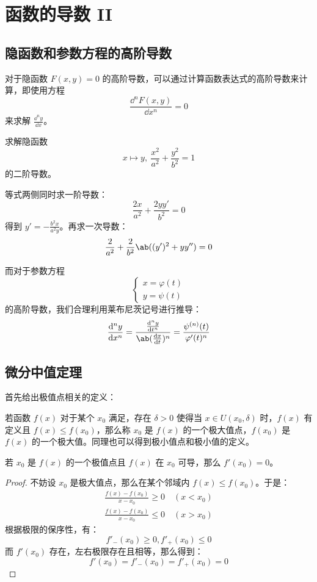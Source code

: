 \section{函数的导数 II}

\subsection{隐函数和参数方程的高阶导数}

对于隐函数 $F(x, y) = 0$ 的高阶导数，可以通过计算函数表达式的高阶导数来计算，即使用方程
$$
\frac{\dd^n F(x, y)}{\dd x^n} = 0
$$
来求解 $\frac{\dd^n y}{\dd x}$。

\begin{example}
	求解隐函数 
	$$
	x \mapsto y,\ \frac{x^2}{a^2} + \frac{y^2}{b^2} = 1
	$$
	的二阶导数。

	\begin{solution}
		等式两侧同时求一阶导数：
		$$
		\frac{2x}{a^2} + \frac{2y y'}{b^2} = 0
		$$
		得到 $y' = -\frac{b^2 x}{a^2 y}$。再求一次导数：
		$$
		\frac{2}{a^2} + \frac{2}{b^2} \ab((y')^2 + y y'') = 0
		$$
	\end{solution}
\end{example}

而对于参数方程
$$
\begin{cases}
	x = \varphi(t) \\
	y = \psi(t)
\end{cases}
$$
的高阶导数，我们合理利用莱布尼茨记号进行推导：
$$
\frac{\dd^n y}{\dd x^n} = \frac{\frac{\dd^n y}{\dd t^n}}{\ab(\dv{x}{t})^n} = \frac{\psi^{(n)}(t)}{\varphi'(t)^n}
$$

\subsection{微分中值定理}

首先给出极值点相关的定义：

\begin{definition}[极值和极值点]
	若函数 $f(x)$ 对于某个 $x_0$ 满足，存在 $\delta > 0$ 使得当 $x \in U(x_0, \delta)$ 时，$f(x)$ 有定义且 $f(x) \le f(x_0)$，那么称 $x_0$ 是 $f(x)$ 的一个极大值点，$f(x_0)$ 是 $f(x)$ 的一个极大值。同理也可以得到极小值点和极小值的定义。
\end{definition}

\begin{lemma}[Fermat 引理]
	若 $x_0$ 是 $f(x)$ 的一个极值点且 $f(x)$ 在 $x_0$ 可导，那么 $f'(x_0) = 0$。

	\begin{proof}
		不妨设 $x_0$ 是极大值点，那么在某个邻域内 $f(x) \le f(x_0)$。于是：
		$$
		\begin{gathered}
			\frac{f(x) - f(x_0)}{x - x_0} \ge 0 \quad (x < x_0) \\
			\frac{f(x) - f(x_0)}{x - x_0} \le 0 \quad (x > x_0)
		\end{gathered}
		$$
		根据极限的保序性，有：
		$$
		f'_-(x_0) \ge 0, f'_+(x_0) \le 0
		$$
		而 $f'(x_0)$ 存在，左右极限存在且相等，那么得到：
		$$
		f'(x_0) = f'_-(x_0) = f'_+(x_0) = 0
		$$
	\end{proof}
\end{lemma}

